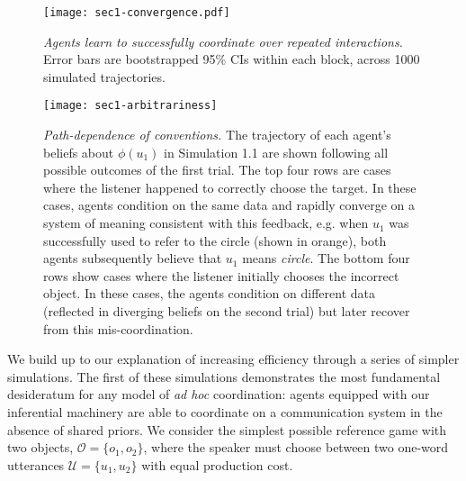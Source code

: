 \begin{figure}[b]
\centering
    \texttt{[image: sec1-convergence.pdf]}
  \caption{\emph{Agents learn to successfully coordinate over repeated interactions.} Error bars are bootstrapped 95\% CIs within each block, across 1000 simulated trajectories.}
  \label{fig:sec1model}
\end{figure}

  \begin{figure*}
\centering
    \texttt{[image: sec1-arbitrariness]}
    \vspace{1em}
  \caption{\emph{Path-dependence of conventions.} The trajectory of each agent's beliefs about $\phi(u_1)$ in Simulation 1.1 are shown following all possible outcomes of the first trial. The top four rows are cases where the listener happened to correctly choose the target. In these cases, agents condition on the same data and rapidly converge on a system of meaning consistent with this feedback, e.g. when $u_1$ was successfully used to refer to the circle (shown in orange), both agents subsequently believe that $u_1$ means \emph{circle}. The bottom four rows show cases where the listener initially chooses the incorrect object. In these cases, the agents condition on different data (reflected in diverging beliefs on the second trial) but later recover from this mis-coordination.}
  \label{fig:path-dependence}
\end{figure*}


We build up to our explanation of increasing efficiency through a series of simpler simulations.
The first of these simulations demonstrates the most fundamental desideratum for any model of \emph{ad hoc} coordination: agents equipped with our inferential machinery are able to coordinate on a communication system in the absence of shared priors. 
We consider the simplest possible reference game with two objects, $\mathcal{O} = \{o_1, o_2\}$, where the speaker must choose between two one-word utterances $\mathcal{U} = \{u_1, u_2\}$ with equal production cost. 

